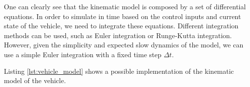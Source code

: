 One can clearly see that the kinematic model is composed by a set of differential equations.
In order to simulate in time based on the control inputs and current state of the vehicle, we need to integrate these equations.
Different integration methods can be used, such as Euler integration or Runge-Kutta integration.
However, given the simplicity and expected slow dynamics of the model, we can use a simple Euler integration with a fixed time step $\Delta t$.

Listing \ref{lst:vehicle_model} shows a possible implementation of the kinematic model of the vehicle.


